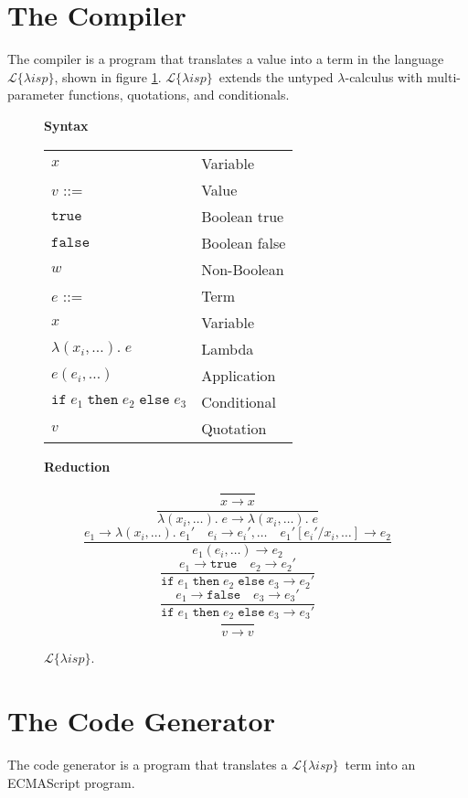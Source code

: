 \documentclass[a4paper]{article}
\newcommand{\lisp}{\ensuremath{\mathcal{L}\{\lambda isp\}}}
\begin{document}
\section{The Compiler}

The compiler is a program that translates a value into a term in the language \lisp, shown in figure \ref{fig:lisp}. \lisp\ extends the untyped $\lambda$-calculus with multi-parameter functions, quotations, and conditionals.

\begin{figure}[h]
\label{fig:lisp}
\caption{\lisp.}

{\bf Syntax}

\begin{tabular}{ll}
$x$ & Variable \\
$v$ ::= & Value \\
\hspace{1em} $\mathtt{true}$ & \hspace{1em} Boolean true \\
\hspace{1em} $\mathtt{false}$ & \hspace{1em} Boolean false \\
\hspace{1em} $w$ & \hspace{1em} Non-Boolean \\
$e$ ::= & Term \\
\hspace{1em} $x$ & \hspace{1em} Variable \\
\hspace{1em} $\lambda(x_i, \dots).\;e$ & \hspace{1em} Lambda \\
\hspace{1em} $e(e_i, \dots)$ & \hspace{1em} Application \\
\hspace{1em} $\mathtt{if}\;e_1\;\mathtt{then}\;e_2\;\mathtt{else}\;e_3$ & \hspace{1em} Conditional \\
\hspace{1em} $v$ & \hspace{1em} Quotation \\
\end{tabular}

\hrulefill

{\bf Reduction}

$$\frac{}{x \rightarrow x}$$
$$\frac{}{\lambda(x_i, \dots).\;e \rightarrow \lambda(x_i, \dots).\;e}$$
$$\frac{e_1 \rightarrow \lambda(x_i, \dots).\;e_1' \quad e_i \rightarrow e_i', \dots \quad e_1'[e_i' / x_i, \dots] \rightarrow e_2}{e_1(e_i, \dots) \rightarrow e_2}$$
$$\frac{e_1 \rightarrow \mathtt{true} \quad e_2 \rightarrow e_2'}{\mathtt{if}\;e_1\;\mathtt{then}\;e_2\;\mathtt{else}\;e_3 \rightarrow e_2'}$$
$$\frac{e_1 \rightarrow \mathtt{false} \quad e_3 \rightarrow e_3'}{\mathtt{if}\;e_1\;\mathtt{then}\;e_2\;\mathtt{else}\;e_3 \rightarrow e_3'}$$
$$\frac{}{v \rightarrow v}$$

\end{figure}

\section{The Code Generator}

The code generator is a program that translates a \lisp\ term into an ECMAScript program.
\end{document}
